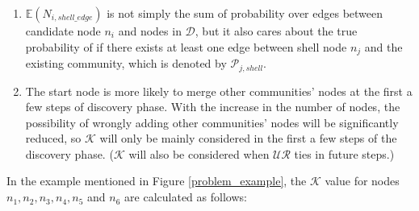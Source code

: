 \documentclass[\main/thesis.tex]{subfiles}
\begin{document}
\begin{enumerate}
\item $\mathbb{E}(N_{i,shell\_edge})$ is not simply the sum of probability over edges between candidate node $n_i$ and nodes in $\mathcal{D}$, but it also cares about the true probability of if there exists at least one edge between shell node $n_j$ and the existing community, which is denoted by $\mathcal{P}_{j,shell}$.
\item The start node is more likely to merge other communities' nodes at the first a few steps of discovery phase. With the increase in the number of nodes, the possibility of wrongly adding other communities' nodes will be significantly reduced, so $\mathcal{K}$ will only be mainly considered in the first a few steps of the discovery phase. ($\mathcal{K}$ will also be considered when $\mathcal{UR}$ ties in future steps.) %
\end{enumerate}

In the example mentioned in Figure \ref{problem_example}, the $\mathcal{K}$ value for nodes $n_1, n_2, n_3, n_4, n_5$ and $n_6$ are calculated as follows:
\end{document}
